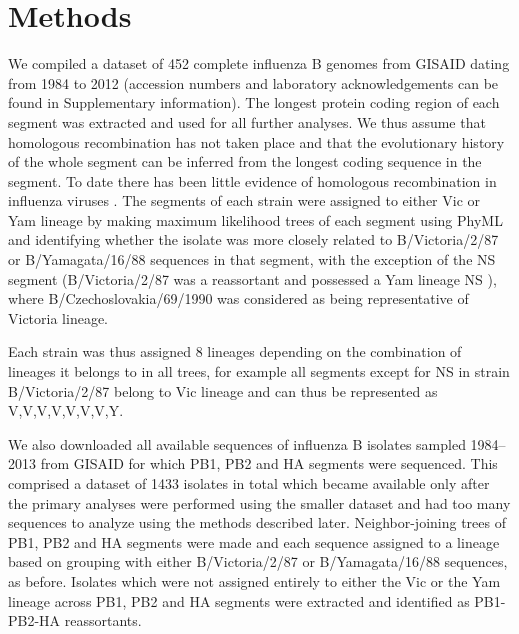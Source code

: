 \documentclass[11pt,oneside,letterpaper]{article}
\begin{document}
\section*{Methods}
We compiled a dataset of 452 complete influenza B genomes from GISAID \cite{GISAID} dating from 1984 to 2012 (accession numbers and laboratory acknowledgements can be found in Supplementary information).
The longest protein coding region of each segment was extracted and used for all further analyses.
We thus assume that homologous recombination has not taken place and that the evolutionary history of the whole segment can be inferred from the longest coding sequence in the segment.
To date there has been little evidence of homologous recombination in influenza viruses \cite{chare2003,boni2008,han2010}.
The segments of each strain were assigned to either Vic or Yam lineage by making maximum likelihood trees of each segment using PhyML \cite{guindon2003} and identifying whether the isolate was more closely related to B/Victoria/2/87 or B/Yamagata/16/88 sequences in that segment, with the exception of the NS segment (B/Victoria/2/87 was a reassortant and possessed a Yam lineage NS \cite{lindstrom1999}), where B/Czechoslovakia/69/1990 was considered as being representative of Victoria lineage.

Each strain was thus assigned 8 lineages depending on the combination of lineages it belongs to in all trees, for example all segments except for NS in strain B/Victoria/2/87 belong to Vic lineage and can thus be represented as V,V,V,V,V,V,V,Y. 

We also downloaded all available sequences of influenza B isolates sampled 1984--2013 from GISAID for which PB1, PB2 and HA segments were sequenced.
This comprised a dataset of 1433 isolates in total which became available only after the primary analyses were performed using the smaller dataset and had too many sequences to analyze using the methods described later. 
Neighbor-joining trees \cite{saitou1987} of PB1, PB2 and HA segments were made and each sequence assigned to a lineage based on grouping with either B/Victoria/2/87 or B/Yamagata/16/88 sequences, as before.
Isolates which were not assigned entirely to either the Vic or the Yam lineage across PB1, PB2 and HA segments were extracted and identified as PB1-PB2-HA reassortants.
\end{document}
